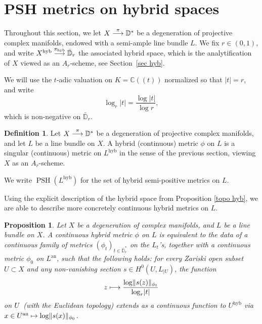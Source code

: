 \documentclass[JEP,XML,SOM,Unicode,published]{cedram}
\newcommand{\NoChangel}[1]{%
\expandafter\let\csname old\string#1\endcsname=#1
\let#1=\relax
\newcommand{#1}{\mathcode`l="716C\csname old\string#1\endcsname\mathcode`l="7160 }%
}
\newcommand\mto{\mathchoice{\longmapsto}{\mapsto}{\mapsto}{\mapsto}}
\newcommand{\To}[1]{\mathchoice{\xrightarrow{\textstyle\kern4pt#1\kern3pt}}{\stackrel{#1}{\longrightarrow}}{}{}}
\newcommand{\lpr}{(\!(}
\newcommand{\rpr}{)\!)}
\newtheorem{prop}[equation]{Proposition}
\theoremstyle{definition}
\newtheorem{defn}[equation]{Definition}
\newcommand \C{\mathbb C}
\newcommand \D {\mathbb{D}}
\newcommand{\an}{\mathrm{an}}
\newcommand{\hol}{\mathrm{hol}}\NoChangel{\hol}
\newcommand{\hyb}{\mathrm{hyb}}
\DeclareMathOperator{\PSH}{PSH}
\begin{document}
\section{PSH metrics on hybrid spaces} \label{sec psh hyb}
Throughout this section, we let $X \To{\pi} \D^*$ be a degeneration of projective complex manifolds, endowed with a semi-ample line bundle $L$. We fix $r \in (0,1)$, and write $X^{\hyb} \To{\pi_{\hyb}} \bar{\D}_r$ the associated hybrid space, which is the analytification of $X$ viewed as an $A_r$-scheme, see Section~\ref{sec hyb}.

We will use the $t$-adic valuation on $K = \C\lpr t\rpr$ normalized so that $\lvert t \rvert = r$, and write
\[
\log_r \lvert t \rvert = \frac{\log \lvert t \rvert}{\log r},
\]
which is non-negative on $\bar{\D}_r$.
\begin{defn}
Let $X \To{\pi} \D^*$ be a degeneration of projective complex manifolds, and let $L$ be a line bundle on $X$. A hybrid (continuous) metric $\phi$ on $L$ is a singular (\resp continuous) metric on $L^{\hyb}$ in the sense of the previous section, viewing $X$ as an $A_r$-scheme.

We write $\PSH(L^{\hyb})$ for the set of hybrid semi-positive metrics on $L$.
\end{defn}
Using the explicit description of the hybrid space from Proposition \ref{topo hyb}, we are able to describe more concretely continuous hybrid metrics on $L$.
\begin{prop} \label{prop metric hyb}
Let $X$ be a degeneration of complex manifolds, and $L$ be a line bundle on $X$. A continuous hybrid metric $\phi$ on $L$ is equivalent to the data of a continuous family of metrics $(\phi_t)_{t \in \bar{\D}_r^*}$ on the $L_t$'s, together with a continuous metric $\phi_0$ on $L^{\an}$, such that the following holds: for every Zariski open subset $U \subset X$ and any non-vanishing section $s \in H^0(U, L_{| U})$, the function
\[
z \mto \frac{\log \lVert s(z) \rVert_{\phi_t}}{\log_r \lvert t \rvert}
\]
on $U^{\hol}$ (with the Euclidean topology) extends as a continuous function to $U^{\hyb}$ via $x \in U^{\an} \mto \log \lVert s(x) \rVert_{\phi_0}$.
\end{prop}
\end{document}
